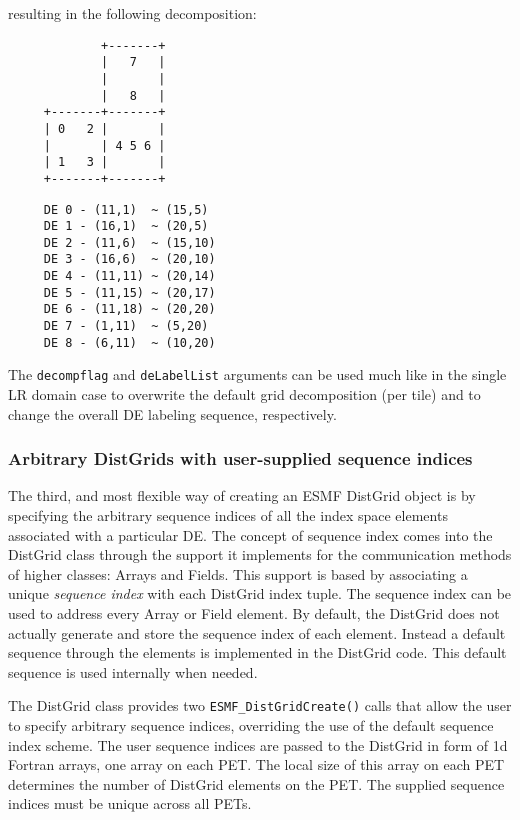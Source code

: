 
   resulting in the following decomposition:
   \begin{verbatim}
             +-------+
             |   7   |
             |       |
             |   8   |
     +-------+-------+
     | 0   2 |       |
     |       | 4 5 6 |
     | 1   3 |       |
     +-------+-------+
   \end{verbatim}
  
   \begin{verbatim}
     DE 0 - (11,1)  ~ (15,5)
     DE 1 - (16,1)  ~ (20,5)
     DE 2 - (11,6)  ~ (15,10)
     DE 3 - (16,6)  ~ (20,10)
     DE 4 - (11,11) ~ (20,14)
     DE 5 - (11,15) ~ (20,17)
     DE 6 - (11,18) ~ (20,20)
     DE 7 - (1,11)  ~ (5,20)
     DE 8 - (6,11)  ~ (10,20)
   \end{verbatim}
  
   The {\tt decompflag} and {\tt deLabelList} arguments can be used much like
   in the single LR domain case to overwrite the default grid decomposition 
   (per tile) and to change the overall DE labeling sequence, respectively. 

   \subsubsection{Arbitrary DistGrids with user-supplied sequence indices}
   \label{DistGrid:ArbitrarySeqInd}
  
   The third, and most flexible way of creating an ESMF DistGrid object is
   by specifying the arbitrary sequence indices of all the index space elements
   associated with a particular DE. The concept of sequence index
   comes into the DistGrid class through the support it implements for the 
   communication methods of higher classes: Arrays and Fields. This support
   is based by associating a unique {\em sequence index} with each
   DistGrid index tuple. The sequence index can be used to address every Array
   or Field element. By default, the DistGrid does not actually generate and
   store the sequence index of each element. Instead a default sequence through
   the elements is implemented in the DistGrid code. This default sequence 
   is used internally when needed.
  
   The DistGrid class provides two {\tt ESMF\_DistGridCreate()} calls that 
   allow the user to specify arbitrary sequence indices, overriding the use of
   the default sequence index scheme. The user sequence indices are passed to
   the DistGrid in form of 1d Fortran arrays, one array on each PET. The local
   size of this array on each PET determines the number of DistGrid elements on
   the PET. The supplied sequence indices must be unique across all PETs. 
   
